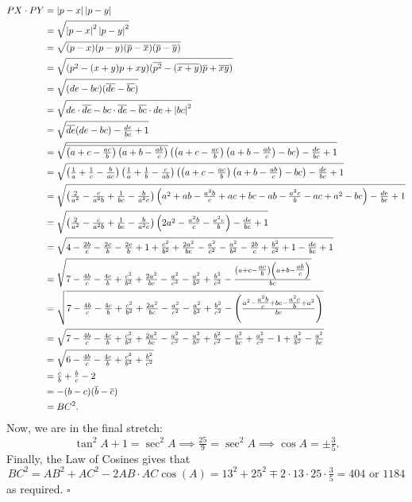 \documentclass{article}
\begin{document}
{\allowdisplaybreaks
\begin{align*}
PX\cdot PY &= \left\lvert p-x \right\rvert\left\lvert p-y \right\rvert \\
&= \sqrt{\left\lvert p-x \right\rvert^2\left\lvert p-y \right\rvert^2} \\
&= \sqrt{(p-x)(p-y)(\overline{p}-\overline{x})(\overline{p}-\overline{y})} \\
&= \sqrt{(p^2-(x+y)p+xy)(\overline{p^2}-(\overline{x+y})\overline{p}+\overline{xy})} \\
&= \sqrt{(de-bc)(\overline{de}-\overline{bc})} \\
&= \sqrt{de\cdot\overline{de}-bc\cdot\overline{de}-\overline{bc}\cdot de+\left\lvert bc \right\rvert^2} \\
&= \sqrt{\overline{de}(de-bc)-\tfrac{de}{bc}+1} \\
&= \sqrt{\overline{\left(a+c-\tfrac{ac}{b}\right)\left(a+b-\tfrac{ab}{c}\right)}\left(\left(a+c-\tfrac{ac}{b}\right)\left(a+b-\tfrac{ab}{c}\right)-bc\right)-\tfrac{de}{bc}+1} \\
&= \sqrt{\left(\tfrac{1}{a}+\tfrac{1}{c}-\tfrac{b}{ac}\right)\left(\tfrac{1}{a}+\tfrac{1}{b}-\tfrac{c}{ab}\right)\left(\left(a+c-\tfrac{ac}{b}\right)\left(a+b-\tfrac{ab}{c}\right)-bc\right)-\tfrac{de}{bc}+1} \\
&= \sqrt{\left(\tfrac{2}{a^2}-\tfrac{c}{a^2b}+\tfrac{1}{bc}-\tfrac{b}{a^2c}\right)\left(a^2+ab-\tfrac{a^2b}{c}+ac+bc-ab-\tfrac{a^2c}{b}-ac+a^2-bc\right)-\tfrac{de}{bc}+1} \\
&= \sqrt{\left(\tfrac{2}{a^2}-\tfrac{c}{a^2b}+\tfrac{1}{bc}-\tfrac{b}{a^2c}\right)\left(2a^2-\tfrac{a^2b}{c}-\tfrac{a^2c}{b}\right)-\tfrac{de}{bc}+1} \\
&= \sqrt{4-\tfrac{2b}{c}-\tfrac{2c}{b}-\tfrac{2c}{b}+1+\tfrac{c^2}{b^2}+\tfrac{2a^2}{bc}-\tfrac{a^2}{c^2}-\tfrac{a^2}{b^2}-\tfrac{2b}{c}+\tfrac{b^2}{c^2}+1-\tfrac{de}{bc}+1} \\
&= \sqrt{7-\tfrac{4b}{c}-\tfrac{4c}{b}+\tfrac{c^2}{b^2}+\tfrac{2a^2}{bc}-\tfrac{a^2}{c^2}-\tfrac{a^2}{b^2}+\tfrac{b^2}{c^2}-\tfrac{\left(a+c-\tfrac{ac}{b}\right)\left(a+b-\tfrac{ab}{c}\right)}{bc}} \\
&= \sqrt{7-\tfrac{4b}{c}-\tfrac{4c}{b}+\tfrac{c^2}{b^2}+\tfrac{2a^2}{bc}-\tfrac{a^2}{c^2}-\tfrac{a^2}{b^2}+\tfrac{b^2}{c^2}-\left(\tfrac{a^2-\tfrac{a^2b}{c}+bc-\tfrac{a^2c}{b}+a^2}{bc}\right)} \\
&= \sqrt{7-\tfrac{4b}{c}-\tfrac{4c}{b}+\tfrac{c^2}{b^2}+\tfrac{2a^2}{bc}-\tfrac{a^2}{c^2}-\tfrac{a^2}{b^2}+\tfrac{b^2}{c^2}-\tfrac{a^2}{bc}+\tfrac{a^2}{c^2}-1+\tfrac{a^2}{b^2}-\tfrac{a^2}{bc}} \\
&= \sqrt{6-\tfrac{4b}{c}-\tfrac{4c}{b}+\tfrac{c^2}{b^2}+\tfrac{b^2}{c^2}} \\
&= \tfrac{c}{b}+\tfrac{b}{c}-2 \\
&= -(b-c)(\overline{b}-\overline{c}) \\
&= BC^2.
\end{align*}
}
Now, we are in the final stretch: \[\tan^2 A+1=\sec^2 A \implies \tfrac{25}{9} = \sec^2 A \implies \cos A = \pm \tfrac{3}{5}.\] Finally, the Law of Cosines gives that \[BC^2 = AB^2+AC^2-2AB\cdot AC\cos(A) = 13^2+25^2\mp2\cdot13\cdot25\cdot\tfrac{3}{5} = \boxed{404}\text{ or }\boxed{1184}\] as required. $\square$
\end{document}
